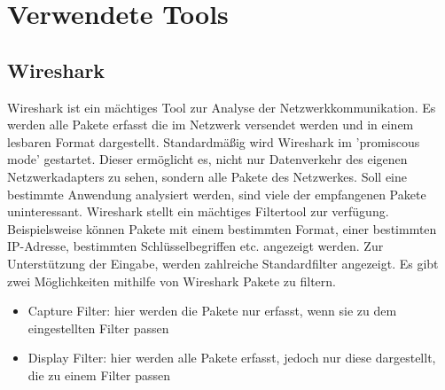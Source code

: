 \section{Verwendete Tools}\label{sec:kaptiel}
\subsection{Wireshark}
\cite{WS1} Wireshark ist ein mächtiges Tool zur Analyse der Netzwerkkommunikation.
Es werden alle Pakete erfasst die im Netzwerk versendet werden und in einem 
lesbaren Format dargestellt. 
Standardmäßig wird Wireshark im 'promiscous mode' gestartet. Dieser ermöglicht
es, nicht nur Datenverkehr des eigenen Netzwerkadapters zu sehen, sondern alle Pakete
des Netzwerkes. 
Soll eine bestimmte Anwendung analysiert werden, sind viele der empfangenen Pakete
uninteressant. Wireshark stellt ein mächtiges Filtertool zur verfügung. 
Beispielsweise können Pakete mit einem bestimmten Format, einer bestimmten IP-Adresse, 
bestimmten Schlüsselbegriffen etc. angezeigt werden. Zur Unterstützung der Eingabe, werden
zahlreiche Standardfilter angezeigt. 
Es gibt zwei Möglichkeiten mithilfe von Wireshark Pakete zu filtern.
\begin{itemize}
    \item Capture Filter: hier werden die Pakete nur erfasst, wenn sie zu dem eingestellten Filter passen
    \item Display Filter: hier werden alle Pakete erfasst, jedoch nur diese dargestellt, die zu einem Filter passen
\end{itemize}


